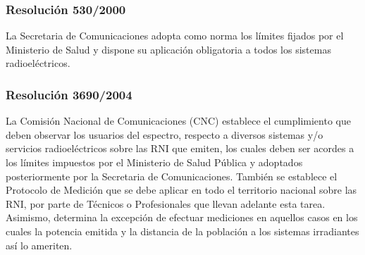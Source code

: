 \subsubsection*{Resolución 530/2000}
La Secretaria de Comunicaciones adopta como norma los límites fijados por el Ministerio de Salud y dispone su aplicación obligatoria a todos los sistemas radioeléctricos.

\subsubsection*{Resolución 3690/2004}
La Comisión Nacional de Comunicaciones (CNC) establece el cumplimiento que deben observar los usuarios del espectro, respecto a diversos sistemas y/o servicios radioeléctricos sobre las RNI que emiten, los cuales deben ser acordes a los límites impuestos por el Ministerio de Salud Pública y adoptados posteriormente por la Secretaria de Comunicaciones. También se establece el Protocolo de Medición que se debe aplicar en todo el territorio nacional sobre las RNI, por parte de Técnicos o Profesionales que llevan adelante esta tarea. Asimismo, determina la excepción de efectuar mediciones en aquellos casos en los cuales la potencia emitida y la distancia de la población a los sistemas irradiantes así lo ameriten. 
